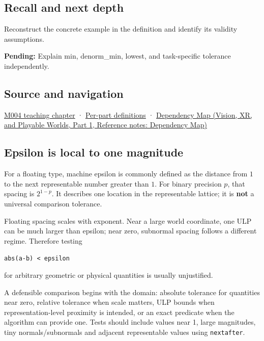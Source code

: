 \subsection{Recall and next depth}\label{appendix-390ea641da54-recall-and-next-depth}

\hypertarget{appendix-390ea641da54-recall-and-next-depth}{}

Reconstruct the concrete example in the definition and identify its validity assumptions.

\textbf{Pending:} Explain min, denorm\_min, lowest, and task-specific tolerance independently.

\subsection{Source and navigation}\label{appendix-390ea641da54-source-and-navigation}

\hypertarget{appendix-390ea641da54-source-and-navigation}{}

\hyperref[01-foundations-i-ch001-a-stretching-ruler-for-real-valued-quantities]{M004 teaching chapter} · \hyperref[appendix-fd090d982a15-m004---parts-61-76]{Per-part definitions} · \href{../07-Vision-XR-and-Playable-Worlds-P01/main.pdf\#nameddest=appendix-4ad47bdd269a}{Dependency Map (Vision, XR, and Playable Worlds, Part 1, Reference notes: Dependency Map)}

\subsection{Epsilon is local to one magnitude}\label{appendix-390ea641da54-epsilon-is-local-to-one-magnitude}

\hypertarget{appendix-390ea641da54-epsilon-is-local-to-one-magnitude}{}

For a floating type, machine epsilon is commonly defined as the distance from \(1\) to the next representable number greater than \(1\). For binary precision \(p\), that spacing is \(2^{1-p}\). It describes one location in the representable lattice; it is \textbf{not} a universal comparison tolerance.

Floating spacing scales with exponent. Near a large world coordinate, one ULP can be much larger than epsilon; near zero, subnormal spacing follows a different regime. Therefore testing

\texttt{abs(a-b)\ \textless{}\ epsilon}

for arbitrary geometric or physical quantities is usually unjustified.

A defensible comparison begins with the domain: absolute tolerance for quantities near zero, relative tolerance when scale matters, ULP bounds when representation-level proximity is intended, or an exact predicate when the algorithm can provide one. Tests should include values near 1, large magnitudes, tiny normals/subnormals and adjacent representable values using \texttt{nextafter}.
